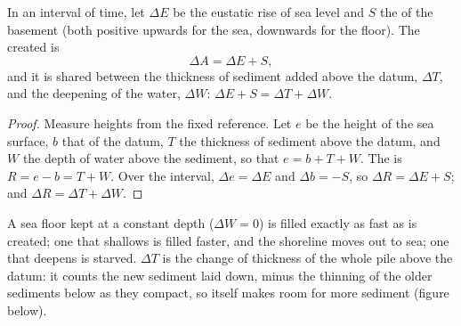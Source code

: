 \begin{proposition}\label{prop:b1:diagenesis-basins:budget}
In an interval of time, let $\Delta E$ be the eustatic rise of sea level and $S$
the  of the basement (both positive upwards for the sea, downwards for
the floor). The  created is
\[
  \Delta A = \Delta E + S ,
\]
and it is shared between the thickness of sediment added above the datum,
$\Delta T$, and the deepening of the water, $\Delta W$:
$\Delta E + S = \Delta T + \Delta W$.
\end{proposition}

\begin{proof}
Measure heights from the fixed reference. Let $e$ be the height of the sea
surface, $b$ that of the datum, $T$ the thickness of sediment above the datum,
and $W$ the depth of water above the sediment, so that $e = b + T + W$. The
 is $R = e - b = T + W$. Over the interval, $\Delta e =
\Delta E$ and $\Delta b = -S$, so $\Delta R = \Delta E + S$; and $\Delta R =
\Delta T + \Delta W$.
\end{proof}

A sea floor kept at a constant depth ($\Delta W = 0$) is filled exactly as fast
as  is created; one that shallows is filled faster, and the
shoreline moves out to sea; one that deepens is starved. $\Delta T$ is the
change of thickness of the whole pile above the datum: it counts the new
sediment laid down, minus the thinning of the older sediments below as they
compact, so  itself makes room for more sediment (figure below).

